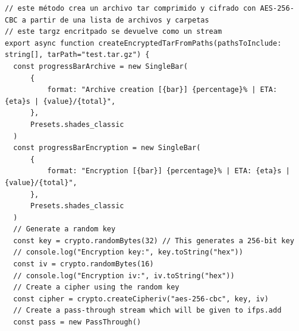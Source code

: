 \begin{verbatim}
// este método crea un archivo tar comprimido y cifrado con AES-256-CBC a partir de una lista de archivos y carpetas
// este targz encritpado se devuelve como un stream
export async function createEncryptedTarFromPaths(pathsToInclude: string[], tarPath="test.tar.gz") {
  const progressBarArchive = new SingleBar(
      {
          format: "Archive creation [{bar}] {percentage}% | ETA: {eta}s | {value}/{total}",
      },
      Presets.shades_classic
  )
  const progressBarEncryption = new SingleBar(
      {
          format: "Encryption [{bar}] {percentage}% | ETA: {eta}s | {value}/{total}",
      },
      Presets.shades_classic
  )
  // Generate a random key
  const key = crypto.randomBytes(32) // This generates a 256-bit key
  // console.log("Encryption key:", key.toString("hex"))
  const iv = crypto.randomBytes(16)
  // console.log("Encryption iv:", iv.toString("hex"))
  // Create a cipher using the random key
  const cipher = crypto.createCipheriv("aes-256-cbc", key, iv) 
  // Create a pass-through stream which will be given to ifps.add
  const pass = new PassThrough()


\end{verbatim}
